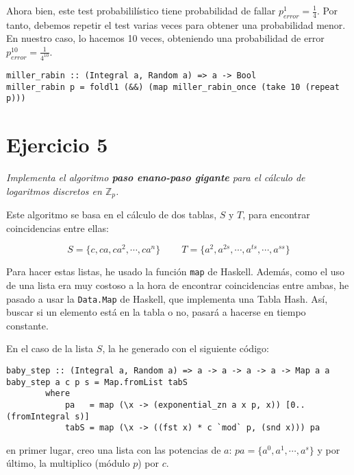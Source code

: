 \documentclass[10pt,spanish]{article}
\begin{document}
Ahora bien, este test probabililístico tiene probabilidad de fallar $p_{error}^1 = \frac{1}{4}$. Por tanto, debemos repetir el test varias veces para obtener una probabilidad menor. En nuestro caso, lo hacemos 10 veces, obteniendo una probabilidad de error $p_{error}^{10} = \frac{1}{4^{10}}$.

\begin{verbatim}
miller_rabin :: (Integral a, Random a) => a -> Bool
miller_rabin p = foldl1 (&&) (map miller_rabin_once (take 10 (repeat p))) 
\end{verbatim}

\section{\textcolor{rojo}Ejercicio 5}
\textit{Implementa el algoritmo \textbf{\textcolor{rojo}{paso enano-paso gigante}} para el cálculo de logaritmos discretos en $\mathbb{Z}_p$.}

Este algoritmo se basa en el cálculo de dos tablas, $S$ y $T$, para encontrar coincidencias entre ellas:

\begin{displaymath}
S = \{c, ca, ca^2, \cdots, ca^n\} \qquad\ T = \{a^2, a^{2s}, \cdots, a^{ts}, \cdots, a^{ss}\}
\end{displaymath}

Para hacer estas listas, he usado la función \texttt{map} de Haskell. Además, como el uso de una lista era muy costoso a la hora de encontrar coincidencias entre ambas, he pasado a usar la \texttt{Data.Map} de Haskell, que implementa una Tabla Hash. Así, buscar si un elemento está en la tabla o no, pasará a hacerse en tiempo constante.

En el caso de la lista $S$, la he generado con el siguiente código:

\begin{verbatim}
baby_step :: (Integral a, Random a) => a -> a -> a -> a -> Map a a
baby_step a c p s = Map.fromList tabS
        where
            pa   = map (\x -> (exponential_zn a x p, x)) [0..(fromIntegral s)]
            tabS = map (\x -> ((fst x) * c `mod` p, (snd x))) pa
\end{verbatim}

en primer lugar, creo una lista con las potencias de $a$: $pa = \{a^0, a^1, \cdots, a^s\}$ y por último, la multiplico (módulo $p$) por $c$.
\end{document}
